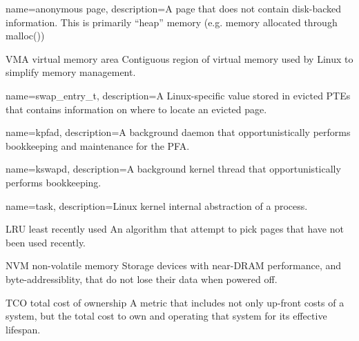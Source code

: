 {
  name={anonymous page},
  description={A page that does not contain disk-backed information. This is
primarily ``heap'' memory (e.g. memory allocated through malloc())}
}

  {VMA}
  {virtual memory area}
  {Contiguous region of virtual memory used by Linux to simplify memory
   management.}

{
  name={swap\_entry\_t},
  description={A Linux-specific value stored in evicted PTEs that contains
information on where to locate an evicted page.}
}

{
  name={kpfad},
  description={A background daemon that opportunistically performs bookkeeping
  and maintenance for the PFA.}
}

{
  name={kswapd},
  description={A background kernel thread that opportunistically performs
    bookkeeping.}
}

{
  name={task},
  description={Linux kernel internal abstraction of a process.}
}

  {LRU}
  {least recently used}
  {An algorithm that attempt to pick pages that have not been used recently.}

  {NVM}
  {non-volatile memory}
  {Storage devices with near-DRAM performance, and byte-addressiblity, that do
  not lose their data when powered off.}

  {TCO}
  {total cost of ownership}
  {A metric that includes not only up-front costs of a system, but the total
  cost to own and operating that system for its effective lifespan.}
